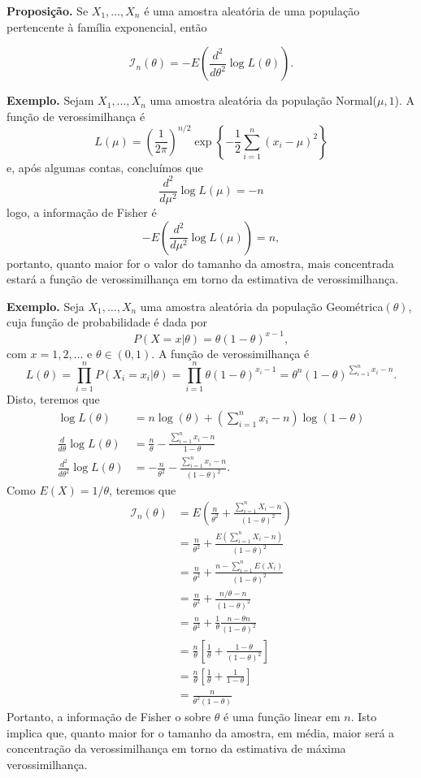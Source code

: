 \documentclass[
  letterpaper,
  DIV=11,
  numbers=noendperiod]{scrartcl}
\begin{document}
\textbf{Proposição.} Se \(X_1,\ldots,X_n\) é uma amostra aleatória de
uma população pertencente à família exponencial, então

\[\mathcal{I}_n(\theta)=-E\left(\frac{d^2}{d\theta^2}\log L(\theta)\right).\]

\textbf{Exemplo.} Sejam \(X_1,\ldots,X_n\) uma amostra aleatória da
população Normal(\(\mu,1\)). A função de verossimilhança é
\[L(\mu)=\left(\frac{1}{2\pi}\right)^{n/2}\exp\left\{-\frac{1}{2}\sum_{i=1}^{n}(x_i-\mu)^2\right\}\]
e, após algumas contas, concluímos que
\[\frac{d^2}{d\mu^2}\log L(\mu)=-n\] logo, a informação de Fisher é
\[-E\left(\frac{d^2}{d\mu^2}\log L(\mu)\right)=n,\] portanto, quanto
maior for o valor do tamanho da amostra, mais concentrada estará a
função de verossimilhança em torno da estimativa de verossimilhança.

\textbf{Exemplo.} Seja \(X_1,\ldots,X_n\) uma amostra aleatória da
população Geométrica\((\theta)\), cuja função de probabilidade é dada
por \[P(X=x|\theta)=\theta(1-\theta)^{x-1},\] com \(x=1,2,\ldots\) e
\(\theta\in(0,1)\). A função de verossimilhança é
\[L(\theta)=\prod_{i=1}^{n}P(X_i=x_i|\theta)=\prod_{i=1}^{n}\theta(1-\theta)^{x_i-1}=\theta^n(1-\theta)^{\sum_{i=1}^{n}x_i-n}.\]
Disto, teremos que \[\begin{align*}
\log L(\theta)&= n\log(\theta) +\left(\sum_{i=1}^{n}x_i-n\right)\log(1-\theta)\\
\frac{d}{d\theta}\log L(\theta)&= \frac{n}{\theta} -\frac{\sum_{i=1}^{n}x_i-n}{1-\theta}\\
\frac{d^2}{d\theta^2}\log L(\theta)&=-\frac{n}{\theta^2}-\frac{\sum_{i=1}^{n}x_i-n}{(1-\theta)^2}.
\end{align*}\] Como \(E(X)=1/\theta\), teremos que \[\begin{align*}
\mathcal{I}_n(\theta)&=E\left(\frac{n}{\theta^2}+\frac{\sum_{i=1}^{n}X_i-n}{(1-\theta)^2}\right)\\
&=\frac{n}{\theta^2}+\frac{E\left(\sum_{i=1}^{n}X_i-n\right)}{(1-\theta)^2}\\
&=\frac{n}{\theta^2}+\frac{n-\sum_{i=1}^{n}E(X_i)}{(1-\theta)^2}\\
&=\frac{n}{\theta^2}+\frac{n/\theta-n}{(1-\theta)^2}\\
&=\frac{n}{\theta^2}+\frac{1}{\theta}\frac{n-\theta n}{(1-\theta)^2}\\
&=\frac{n}{\theta}\left[\frac{1}{\theta}+\frac{1-\theta}{(1-\theta)^2}\right]\\
&=\frac{n}{\theta}\left[\frac{1}{\theta}+\frac{1}{1-\theta}\right]\\
&=\frac{n}{\theta^2(1-\theta)}
\end{align*}\] Portanto, a informação de Fisher o sobre \(\theta\) é uma
função linear em \(n\). Isto implica que, quanto maior for o tamanho da
amostra, em média, maior será a concentração da verossimilhança em torno
da estimativa de máxima verossimilhança.
\end{document}
